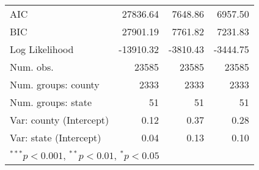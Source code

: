 \begin{tabular}{l D{)}{)}{11)3} D{)}{)}{11)3} D{)}{)}{11)3} }
\midrule
AIC                                         & 27836.64              & 7648.86               & 6957.50               \\
BIC                                         & 27901.19              & 7761.82               & 7231.83               \\
Log Likelihood                              & -13910.32             & -3810.43              & -3444.75              \\
Num. obs.                                   & 23585                 & 23585                 & 23585                 \\
Num. groups: county                         & 2333                  & 2333                  & 2333                  \\
Num. groups: state                          & 51                    & 51                    & 51                    \\
Var: county (Intercept)                     & 0.12                  & 0.37                  & 0.28                  \\
Var: state (Intercept)                      & 0.04                  & 0.13                  & 0.10                  \\
\bottomrule
{}
\end{tabular}
